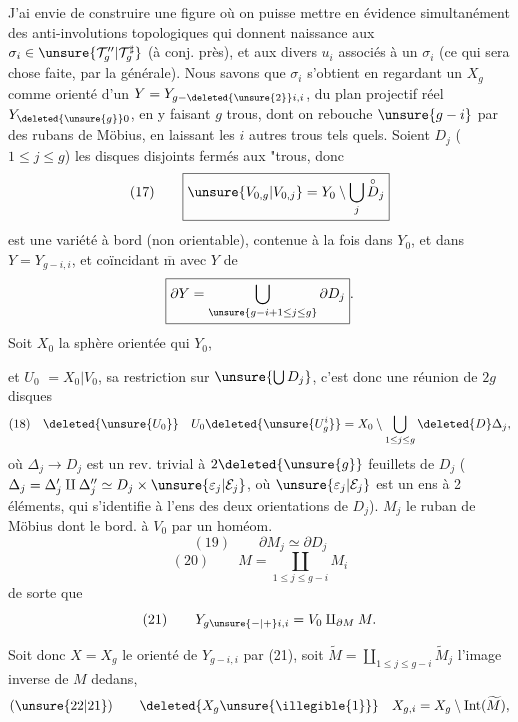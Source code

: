 J'ai envie de construire une figure  où
on puisse mettre en évidence simultanément
des anti-involutions topologiques
qui  donnent naissance aux
$\sigma_i\in\unsure{\mathcal{T}_g^{\prime\prime}|\mathcal{T}_g^\sharp}$ (à conj. près), et aux divers
$u_i$  associés à un $\sigma_i$ (ce qui sera chose
faite, par la  générale). Nous
savons que $\sigma_i$  s'obtient en regardant
un $X_g$ comme  orienté
d'un $Y=Y_{g-\deleted{\unsure{2}}i,i}$, 
du  plan projectif réel $Y_{\deleted{\unsure{g}}0}$, en
y faisant $g$ trous, dont on  rebouche
$\unsure{g-i}$ par des rubans de Möbius, en
laissant les $i$ autres trous tels quels.
Soient $D_j$ ($1\le j\le g$) les disques disjoints
fermés  aux "trous, donc
\[
(17)\qquad \boxed{\unsure{V_{0,g}|V_{0,j}}=Y_0\setminus\bigcup_j \overset{\circ}{D}_j}
\]
est une variété à bord
(non orientable), contenue à la fois dans
$Y_0$, et dans $Y=Y_{g-i,i}$, et coïncidant
$\overline{\mathrm m}$ avec $Y$  de
\[
\boxed{\partial Y=\bigcup_{\unsure{g-i+1\le j\le g}}\partial D_j}.
\]
 Soit $X_0$ la sphère orientée qui  $Y_0$,

et $U_0$  $=X_0\vert V_0$, sa restriction sur $\unsure{\bigcup D_j}$,
c'est donc  une réunion de $2g$ disques
\[
(18)\quad \deleted{\unsure{U_0}}\quad U_0\deleted{\unsure{U_g^i}}=X_0\setminus\bigcup_{1\le j\le g}\deleted{D}\Delta_j,
\]
où $\Delta_j\longrightarrow D_j$ est un rev. trivial à $2\deleted{\unsure{g}}$
feuillets de $D_j$ ($\Delta_j=\Delta'_j\amalg\Delta''_j\simeq D_j\times\unsure{\varepsilon_j|\mathcal{E}_j}$,
où $\unsure{\varepsilon_j|\mathcal{E}_j}$ est un ens à 2 éléments, qui s'identifie
à l'ens des deux orientations de
$D_j$). 
 $M_j$  le ruban de Möbius dont le bord.
 à $V_0$ par un homéom.
\[
(19)\qquad \partial M_j\simeq\partial D_j
\]
\[
(20)\qquad M=\coprod_{1\le j\le g-i} M_i
\]
de sorte que
\[
(21)\qquad Y_{g\unsure{-|+}i,i}=V_0\amalg_{\partial M}M.
\]


Soit donc $X=X_g$ le  orienté
de $Y_{g-i,i}$  par (21), soit $\widetilde M=\coprod_{1\le j\le g-i}\widetilde M_j$
l'image inverse de $M$ dedans, 
 
\[
(\unsure{22|21})\qquad \deleted{X_g\unsure{\illegible{1}}}\quad X_{g,i}=X_g\setminus\operatorname{Int}(\widetilde M),
\]
